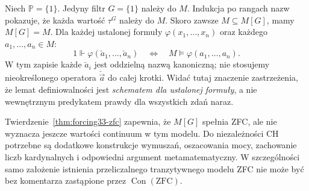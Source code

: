 \begin{przyklad}
\label{ex:forcing33-trivial}
Niech $\mathbb P=\{1\}$.
Jedyny filtr $G=\{1\}$ należy do $M$.
Indukcja po rangach nazw pokazuje,
że każda wartość $\tau^G$ należy do $M$.
Skoro zawsze $M\subseteq M[G]$,
mamy $M[G]=M$. Dla każdej ustalonej formuły
$\varphi(x_1,\ldots,x_n)$ oraz
każdego $a_1,\ldots,a_n\in M$:
\[
 1\Vdash\varphi(\check a_1,\ldots,\check a_n)
 \quad\iff\quad M\models
             \varphi(a_1,\ldots,a_n).
\]
W tym zapisie każde $\check a_i$
jest oddzielną nazwą kanoniczną;
nie stosujemy nieokreślonego
operatora $\check{\vec a}$ do całej krotki.
Widać tutaj znaczenie zastrzeżenia,
że lemat definiowalności jest
\emph{schematem dla ustalonej formuły},
a nie wewnętrznym predykatem
prawdy dla wszystkich zdań naraz.
\end{przyklad}

\begin{uwaga}
\label{rem:forcing33-ch}
Twierdzenie~\ref{thm:forcing33-zfc}
zapewnia, że $M[G]$ spełnia ZFC,
ale nie wyznacza jeszcze
wartości continuum w tym modelu.
Do niezależności CH potrzebne są
dodatkowe konstrukcje wymuszań,
oszacowania mocy, zachowanie
liczb kardynalnych i odpowiedni
argument metamatematyczny.
W szczególności samo założenie
istnienia przeliczalnego
tranzytywnego modelu ZFC
nie może być bez komentarza
zastąpione przez
$\operatorname{Con}(\mathrm{ZFC})$.
\end{uwaga}
